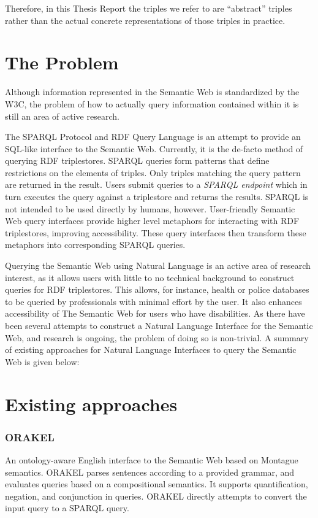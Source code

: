 \documentclass[../main.tex]{subfiles}
\begin{document}
Therefore, in this Thesis Report the triples we refer to are ``abstract'' triples rather than the actual concrete representations of those triples in practice.


\section {The Problem}

Although information represented in the Semantic Web is standardized by the W3C\cite{w3csemanticweb}, the problem of how to actually query information contained within it is still an area of active research.

The SPARQL Protocol and RDF Query Language is an attempt to provide an SQL-like interface to the Semantic Web.  Currently, it is the de-facto method of querying RDF triplestores.  SPARQL queries form patterns that define restrictions on the elements of triples.  Only triples matching the query pattern are returned in the result.  Users submit queries to a {\em SPARQL endpoint} which in turn executes the query against a triplestore and returns the results.  SPARQL is not intended to be used directly by humans, however. User-friendly Semantic Web query interfaces provide higher level metaphors for interacting with RDF triplestores, improving accessibility.  These query interfaces then transform these metaphors into corresponding SPARQL queries.

Querying the Semantic Web using Natural Language is an active area of research interest, as it allows users with little to no technical background to construct queries for RDF triplestores.  This allows, for instance, health or police databases to be queried by professionals with minimal effort by the user.  It also enhances accessibility of The Semantic Web for users who have disabilities.  As there have been several attempts to construct a Natural Language Interface for the Semantic Web, and research is ongoing, the problem of doing so is non-trivial.  A summary of existing approaches for Natural Language Interfaces to query the Semantic Web is given below:


\section {Existing approaches}

\subsubsection{ORAKEL}
An ontology-aware English interface to the Semantic Web based on Montague semantics\cite{cimiano2007orakel}.  ORAKEL parses sentences according to a provided grammar,
and evaluates queries based on a compositional semantics.  It supports quantification, negation, and conjunction in queries.  ORAKEL directly attempts to convert the input query to a SPARQL query.
\end{document}
